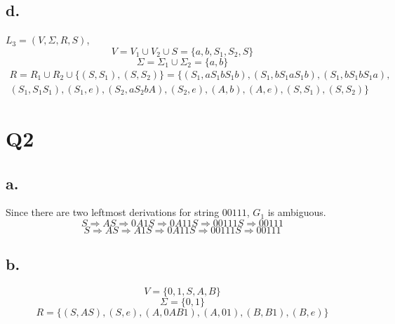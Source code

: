 \documentclass[12pt]{article}
\begin{document}
\subsection*{d.}
$L_3 = (V, \Sigma, R, S)$,
	\begin{equation*}
		V = V_1 \cup V_2 \cup S = \{a,b,S_1,S_2,S\}
	\end{equation*}
	\begin{equation*}
		\Sigma = \Sigma_1 \cup \Sigma_2 = \{a,b\}
	\end{equation*}
	\begin{equation*}
		\begin{split}
			R = R_1 \cup R_2 \cup \{(S, S_1), (S, S_2)\} = \{(S_1, aS_1bS_1b), (S_1, bS_1aS_1b), (S_1, bS_1bS_1a), \\ (S_1, S_1S_1), (S_1, e), (S_2, aS_2bA), (S_2, e), (A, b), (A, e), (S, S_1), (S, S_2)\}
		\end{split}
	\end{equation*}

\section*{Q2}
\subsection*{a.}
Since there are two leftmost derivations for string $00111$, $G_1$ is ambiguous.
\begin{equation*}
	S \Rightarrow AS \Rightarrow 0A1S \Rightarrow 0A11S \Rightarrow 00111S \Rightarrow 00111
\end{equation*}
\begin{equation*}
	S \Rightarrow AS \Rightarrow A1S \Rightarrow 0A11S \Rightarrow 00111S \Rightarrow 00111
\end{equation*}
\subsection*{b.}
	\begin{equation*}
		V = \{0,1,S,A,B\}
	\end{equation*}
	\begin{equation*}
		\Sigma = \{0,1\}
	\end{equation*}
	\begin{equation*}
		R = \{(S, AS), (S, e), (A, 0AB1), (A, 01), (B,B1), (B, e)\}
	\end{equation*}
\end{document}
